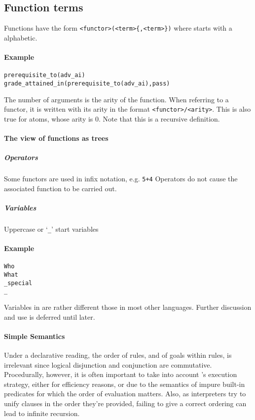 \documentclass[thesis-solanki.tex]{subfiles}
\begin{document}
\subsection{Function terms}

Functions have the form \Verb!<functor>(<term>{,<term>})!
where  starts with a  alphabetic. 
\paragraph{Example}
\par
\begin{verbatim}
prerequisite_to(adv_ai)
grade_attained_in(prerequisite_to(adv_ai),pass)
\end{verbatim}
     
The number of arguments is the arity of the function. When referring to a functor, it is written with its arity in
the format \Verb!<functor>/<arity>!. This is also true for atoms, whose arity is 0.
Note that this is a recursive definition.
\paragraph{The view of functions as trees}
\subparagraph{Operators}
Some functors are used in infix notation, e.g.\yyy{}{\Large,} \Verb!5+4!
Operators do not cause the associated function to be carried out.
\subparagraph{Variables}

Uppercase or `\Verb!_!'  start  variables
\paragraph{Example}
\begin{verbatim}
Who
What
_special
_
\end{verbatim}
     
Variables in  are rather different  those in most other languages. Further discussion and use is deferred until later.


\paragraph{Simple Semantics}

Under a declarative reading, the order of rules, and of goals within rules, is irrelevant since logical disjunction and conjunction are 
commutative.
Procedurally, however, it is often important to take into account 's execution strategy, either
for efficiency reasons, or due to the semantics of impure built-in predicates for which the order of evaluation
matters.
Also, as  interpreters try to unify clauses in the order they're provided, failing to give a
correct ordering can lead to infinite recursion.
\end{document}
